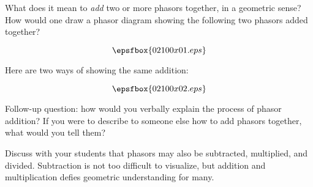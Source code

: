 

What does it mean to {\it add} two or more phasors together, in a geometric sense?  How would one draw a phasor diagram showing the following two phasors added together?

$$\epsfbox{02100x01.eps}$$







Here are two ways of showing the same addition:

$$\epsfbox{02100x02.eps}$$

Follow-up question: how would you verbally explain the process of phasor addition?  If you were to describe to someone else how to add phasors together, what would you tell them?







Discuss with your students that phasors may also be subtracted, multiplied, and divided.  Subtraction is not too difficult to visualize, but addition and multiplication defies geometric understanding for many.




